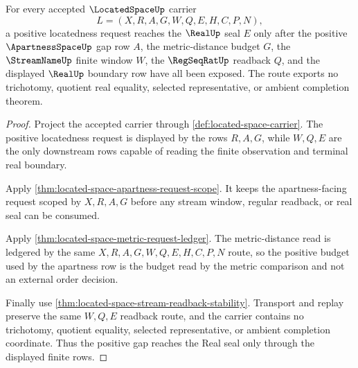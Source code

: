 \begin{theorem}
\label{thm:locatedspace-positive-gap-exactness}
For every accepted $\LocatedSpaceUp$ carrier
$$
L=(X,R,A,G,W,Q,E,H,C,P,N),
$$
a positive locatedness request reaches the $\RealUp$ seal $E$ only after the positive $\ApartnessSpaceUp$ gap row $A$, the metric-distance budget $G$, the $\StreamNameUp$ finite window $W$, the $\RegSeqRatUp$ readback $Q$, and the displayed $\RealUp$ boundary row have all been exposed. The route exports no trichotomy, quotient real equality, selected representative, or ambient completion theorem.
\end{theorem}
\begin{proof}
Project the accepted carrier through \autoref{def:located-space-carrier}. The positive locatedness request is displayed by the rows $R,A,G$, while $W,Q,E$ are the only downstream rows capable of reading the finite observation and terminal real boundary.

Apply \autoref{thm:located-space-apartness-request-scope}. It keeps the apartness-facing request scoped by $X,R,A,G$ before any stream window, regular readback, or real seal can be consumed.

Apply \autoref{thm:located-space-metric-request-ledger}. The metric-distance read is ledgered by the same $X,R,A,G,W,Q,E,H,C,P,N$ route, so the positive budget used by the apartness row is the budget read by the metric comparison and not an external order decision.

Finally use \autoref{thm:located-space-stream-readback-stability}. Transport and replay preserve the same $W,Q,E$ readback route, and the carrier contains no trichotomy, quotient equality, selected representative, or ambient completion coordinate. Thus the positive gap reaches the Real seal only through the displayed finite rows.
\end{proof}

